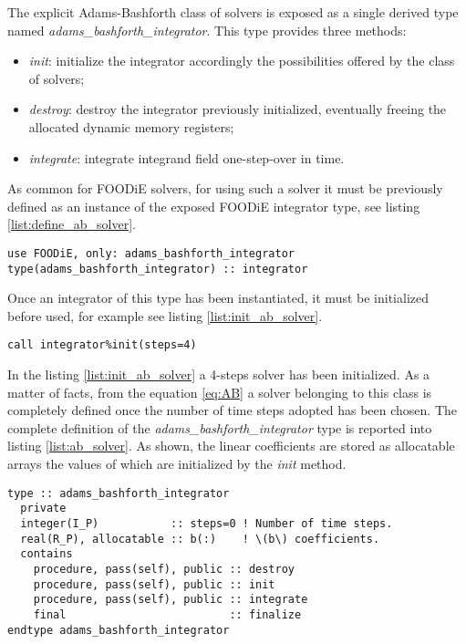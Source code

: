 \documentclass[pdftex,preprint,3p,times,numbers]{elsarticle}
\begin{document}
The explicit Adams-Bashforth class of solvers is exposed as a single derived type named \emph{adams\_bashforth\_integrator}. This type provides three methods:

\begin{itemize}
  \item \emph{init}: initialize the integrator accordingly the possibilities offered by the class of solvers;
  \item \emph{destroy}: destroy the integrator previously initialized, eventually freeing the allocated dynamic memory registers;
  \item \emph{integrate}: integrate integrand field one-step-over in time.
  \end{itemize}

As common for FOODiE solvers, for using such a solver it must be previously defined as an instance of the exposed FOODiE integrator type, see listing \ref{list:define_ab_solver}.

\begin{lstlisting}[firstnumber=1,style=code,caption={definition of an explicit Adams-Bashforth integrator},label={list:define_ab_solver}]
use FOODiE, only: adams_bashforth_integrator
type(adams_bashforth_integrator) :: integrator
\end{lstlisting}

Once an integrator of this type has been instantiated, it must be initialized before used, for example see listing \ref{list:init_ab_solver}.

\begin{lstlisting}[firstnumber=1,style=code,caption={example of initialization of an explicit Adams-Bashforth integrator},label={list:init_ab_solver}]
call integrator%init(steps=4)
\end{lstlisting}

In the listing \ref{list:init_ab_solver} a 4-steps solver has been initialized. As a matter of facts, from the equation \ref{eq:AB} a solver belonging to this class is completely defined once the number of time steps adopted has been chosen. The complete definition of the \emph{adams\_bashforth\_integrator} type is reported into listing \ref{list:ab_solver}. As shown, the linear coefficients are stored as allocatable arrays the values of which are initialized by the \emph{init} method.

\begin{lstlisting}[firstnumber=1,style=code,caption={definition of \emph{adams\_bashforth\_integrator} type},label={list:ab_solver}]
type :: adams_bashforth_integrator
  private
  integer(I_P)           :: steps=0 ! Number of time steps.
  real(R_P), allocatable :: b(:)    ! \(b\) coefficients.
  contains
    procedure, pass(self), public :: destroy
    procedure, pass(self), public :: init
    procedure, pass(self), public :: integrate
    final                         :: finalize
endtype adams_bashforth_integrator
\end{lstlisting}
\end{document}
